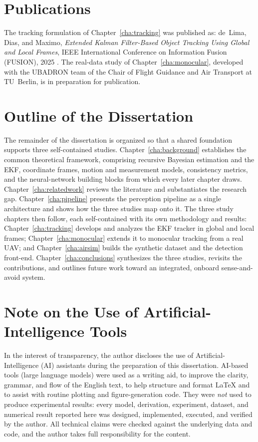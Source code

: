 \section{Publications}

The tracking formulation of Chapter~\ref{cha:tracking} was published as:
de~Lima, Dias, and Maximo, \emph{Extended Kalman Filter-Based Object Tracking
Using Global and Local Frames}, IEEE International Conference on Information
Fusion (FUSION), 2025 \cite{delima2025fusion}. The real-data study of
Chapter~\ref{cha:monocular}, developed with the UBADRON team of the Chair of
Flight Guidance and Air Transport at TU~Berlin, is in preparation for publication.

\section{Outline of the Dissertation}

The remainder of the dissertation is organized so that a shared foundation
supports three self-contained studies. Chapter~\ref{cha:background} establishes
the common theoretical framework, comprising recursive Bayesian estimation and the
EKF, coordinate frames, motion and measurement models, consistency metrics, and the
neural-network building blocks from which every later chapter draws.
Chapter~\ref{cha:relatedwork} reviews the literature and substantiates the
research gap. Chapter~\ref{cha:pipeline} presents the perception pipeline as a
single architecture and shows how the three studies map onto it. The three study
chapters then follow, each self-contained with its own methodology and results:
Chapter~\ref{cha:tracking} develops and analyzes the EKF tracker in global and
local frames; Chapter~\ref{cha:monocular} extends it to monocular tracking from a
real UAV; and Chapter~\ref{cha:airsim} builds the synthetic dataset and the
detection front-end. Chapter~\ref{cha:conclusions} synthesizes the three studies,
revisits the contributions, and outlines future work toward an integrated,
onboard sense-and-avoid system.

\section{Note on the Use of Artificial-Intelligence Tools}
\label{sec:ai_disclaimer}

In the interest of transparency, the author discloses the use of
Artificial-Intelligence (AI) assistants during the preparation of this
dissertation. AI-based tools (large language models) were used as a writing aid,
to improve the clarity, grammar, and flow of the English text, to help structure
and format \LaTeX{} and to assist with routine plotting and figure-generation
code. They were \emph{not} used to produce experimental results: every model,
derivation, experiment, dataset, and numerical result reported here was designed,
implemented, executed, and verified by the author. All technical claims were
checked against the underlying data and code, and the author takes full
responsibility for the content.
